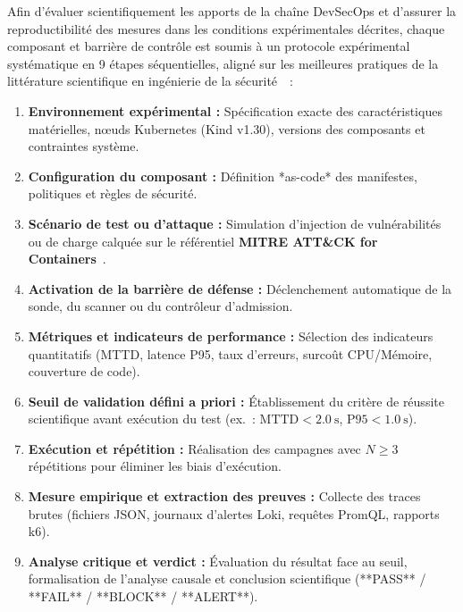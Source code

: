 Afin d'évaluer scientifiquement les apports de la chaîne DevSecOps et d'assurer la reproductibilité des mesures dans les conditions expérimentales décrites, chaque composant et barrière de contrôle est soumis à un protocole expérimental systématique en 9 étapes séquentielles, aligné sur les meilleures pratiques de la littérature scientifique en ingénierie de la sécurité~\cite{cncf_security_whitepaper, dora_metrics_2018, myrbakken_devsecops_2017}~:

\begin{enumerate}
    \item \textbf{Environnement expérimental :} Spécification exacte des caractéristiques matérielles, nœuds Kubernetes (Kind v1.30), versions des composants et contraintes système.
    \item \textbf{Configuration du composant :} Définition *as-code* des manifestes, politiques et règles de sécurité.
    \item \textbf{Scénario de test ou d'attaque :} Simulation d'injection de vulnérabilités ou de charge calquée sur le référentiel \textbf{MITRE ATT\&CK for Containers}~\cite{mitre_attack_containers}.
    \item \textbf{Activation de la barrière de défense :} Déclenchement automatique de la sonde, du scanner ou du contrôleur d'admission.
    \item \textbf{Métriques et indicateurs de performance :} Sélection des indicateurs quantitatifs (MTTD, latence P95, taux d'erreurs, surcoût CPU/Mémoire, couverture de code).
    \item \textbf{Seuil de validation défini a priori :} Établissement du critère de réussite scientifique avant exécution du test (ex.~: $\text{MTTD} < 2.0~\text{s}$, $\text{P95} < 1.0~\text{s}$).
    \item \textbf{Exécution et répétition :} Réalisation des campagnes avec $N \ge 3$ répétitions pour éliminer les biais d'exécution.
    \item \textbf{Mesure empirique et extraction des preuves :} Collecte des traces brutes (fichiers JSON, journaux d'alertes Loki, requêtes PromQL, rapports k6).
    \item \textbf{Analyse critique et verdict :} Évaluation du résultat face au seuil, formalisation de l'analyse causale et conclusion scientifique (**PASS** / **FAIL** / **BLOCK** / **ALERT**).
\end{enumerate}

